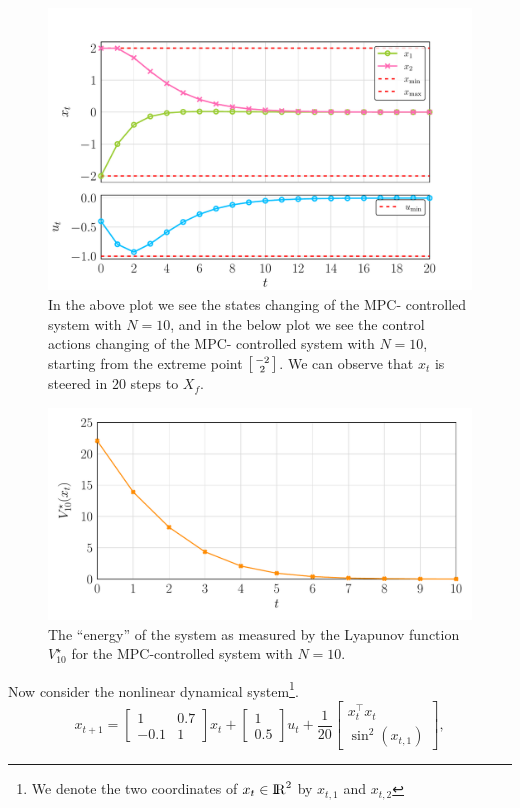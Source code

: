 \documentclass[a4paper,11pt,reqno]{amsart}
\newcommand{\R}{{\rm I\!R}}
\newcommand{\tran}{\intercal}
\begin{document}
\begin{figure}[H]
    \centering
    \vspace{-0.35cm}
    \includegraphics[width=0.7\linewidth]{figures/q3_iii_xt_ut.pdf}
    \caption{In the above plot we see the states changing of the MPC-
    controlled system with $N = 10$, and in the below plot we see the control actions changing of the MPC-
    controlled system with $N = 10$, starting from the extreme point $\begin{bsmallmatrix}-2\\2\end{bsmallmatrix}$. 
    We can observe that $x_t$ is steered in $20$ steps to $X_f$.}
    \label{fig:q3_iii_xt_ut}
\end{figure}
\begin{figure}[H]
    \centering
    \vspace{-0.35cm}
    \includegraphics[width=0.7\linewidth]{figures/q3_iii_cost.pdf}
    \caption{The ``energy'' of the system as measured by the Lyapunov function $V^{\star}_{10}$ for the MPC-controlled system with $N = 10$.}
    \label{fig:q3_iii_cost}
\end{figure}
Now consider the nonlinear dynamical system\footnote[2]{We denote the two coordinates of $x_t\in\R^2$ by $x_{t,1}$ and $x_{t,2}$}.
\begin{equation}
    x_{t+1}=
    \begin{bmatrix}
        1&0.7\\
        -0.1&1
    \end{bmatrix}
    x_t+
    \begin{bmatrix}
        1\\
        0.5
    \end{bmatrix}
    u_t+
    \frac{1}{20}
    \begin{bmatrix}
        x_t^{\tran}x_t\\
        \sin^2(x_{t,1})
    \end{bmatrix},
\end{equation}
\end{document}
